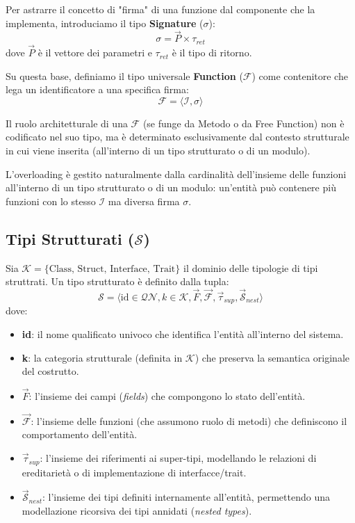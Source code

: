 Per astrarre il concetto di "firma" di una funzione dal componente
che la implementa, introduciamo il tipo \textbf{Signature} ($\sigma$):
$$\sigma = \vec{P} \times \tau_{ret}$$
dove $\vec{P}$ è il vettore dei parametri e $\tau_{ret}$ è il tipo di ritorno.

Su questa base, definiamo il tipo universale \textbf{Function}
($\mathcal{F}$) come contenitore che lega un identificatore a una
specifica firma:
$$\mathcal{F} = \langle \mathcal{I}, \sigma \rangle$$

Il ruolo architetturale di una $\mathcal{F}$ (se funge da Metodo o da
Free Function) non è codificato nel suo tipo, ma è determinato
esclusivamente dal contesto strutturale in cui viene inserita
(all'interno di un tipo strutturato o di un modulo).

L'overloading è gestito naturalmente dalla cardinalità dell'insieme
delle funzioni all'interno di un tipo strutturato o di un modulo:
un'entità può contenere più funzioni con lo stesso $\mathcal{I}$ ma
diversa firma $\sigma$.

\subsection{Tipi Strutturati ($\mathcal{S}$)}
Sia $\mathcal{K} = \{ \text{Class, Struct, Interface, Trait} \}$ il
dominio delle tipologie di tipi struttrati. Un tipo strutturato è
definito dalla tupla:
$$\mathcal{S} = \langle \text{id} \in \mathcal{QN}, k \in
\mathcal{K}, \vec{F}, \vec{\mathcal{F}}, \vec{\tau}_{sup},
\vec{\mathcal{S}}_{nest} \rangle$$
dove:
\begin{itemize}
  \item \textbf{id}: il nome qualificato univoco che identifica
    l'entità all'interno del sistema.
  \item \textbf{k}: la categoria strutturale (definita in
    $\mathcal{K}$) che preserva la semantica originale del costrutto.
  \item $\vec{F}$: l'insieme dei campi (\textit{fields}) che
    compongono lo stato dell'entità.
  \item $\vec{\mathcal{F}}$: l'insieme delle funzioni (che assumono
    ruolo di metodi) che definiscono il comportamento dell'entità.
  \item $\vec{\tau}_{sup}$: l'insieme dei riferimenti ai super-tipi,
    modellando le relazioni di ereditarietà o di implementazione di
    interfacce/trait.
  \item $\vec{\mathcal{S}}_{nest}$: l'insieme dei tipi definiti
    internamente all'entità, permettendo una modellazione ricorsiva
    dei tipi annidati (\textit{nested types}).
\end{itemize}

